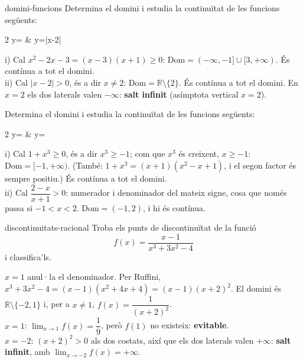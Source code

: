 \begin{apartats}

\begin{tria}{domini-funcions}
Determina el domini i estudia la continuïtat de les funcions següents:
\begin{graella}{2}
  \sa y= & \sa y=\ln|x-2|
\end{graella}

\begin{solucio}
i) Cal $x^2-2x-3=(x-3)(x+1)\ge0$: $\mathrm{Dom}=(-\infty,-1]\cup[3,+\infty)$.
És contínua a tot el domini.\\
ii) Cal $|x-2|>0$, és a dir $x\ne2$: $\mathrm{Dom}=\mathbb{R}\setminus\{2\}$.
És contínua a tot el domini. En $x=2$ els dos laterals valen $-\infty$:
\textbf{salt infinit} (asímptota vertical $x=2$).
\end{solucio}

Determina el domini i estudia la continuïtat de les funcions següents:
\begin{graella}{2}
  \sa y= & \sa y=\ln{}
\end{graella}

\begin{solucio}
i) Cal $1+x^3\ge0$, és a dir $x^3\ge-1$; com que $x^3$ és creixent, $x\ge-1$:
$\mathrm{Dom}=[-1,+\infty)$. (També: $1+x^3=(x+1)(x^2-x+1)$, i el segon factor és sempre
positiu.) És contínua a tot el domini.\\
ii) Cal $\dfrac{2-x}{x+1}>0$: numerador i denominador del mateix signe, cosa que només passa
si $-1<x<2$. $\mathrm{Dom}=(-1,2)$, i hi és contínua.
\end{solucio}
\end{tria}

\begin{tria}{discontinuitats-racional}
Troba els punts de discontinuïtat de la funció
\[
f(x)=\frac{x-1}{x^3+3x^2-4}
\]
i classifica'ls.

\begin{solucio}
$x=1$ anul·la el denominador. Per Ruffini, $x^3+3x^2-4=(x-1)(x^2+4x+4)=(x-1)(x+2)^2$.
El domini és $\mathbb{R}\setminus\{-2,1\}$ i, per a $x\neq1$, $f(x)=\dfrac{1}{(x+2)^2}$.\\
$x=1$: $\lim_{x\to1}f(x)=\dfrac19$, però $f(1)$ no existeix: \textbf{evitable}.\\
$x=-2$: $(x+2)^2>0$ als dos costats, així que els dos laterals valen $+\infty$:
\textbf{salt infinit}, amb $\lim_{x\to-2}f(x)=+\infty$.
\end{solucio}


\end{tria}
\end{apartats}
